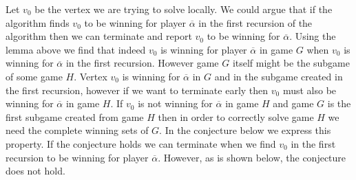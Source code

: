 Let $v_0$ be the vertex we are trying to solve locally. We could argue that if the algorithm finds $v_0$ to be winning for player $\overline{\alpha}$ in the first recursion of the algorithm then we can terminate and report $v_0$ to be winning for $\overline{\alpha}$. Using the lemma above we find that indeed $v_0$ is winning for player $\overline{\alpha}$ in game $G$ when $v_0$ is winning for $\overline{\alpha}$ in the first recursion. However game $G$ itself might be the subgame of some game $H$. Vertex $v_0$ is winning for $\overline{\alpha}$ in $G$ and in the subgame created in the first recursion, however if we want to terminate early then $v_0$ must also be winning for $\overline{\alpha}$ in game $H$. If $v_0$ is not winning for $\overline{\alpha}$ in game $H$ and game $G$ is the first subgame created from game $H$ then in order to correctly solve game $H$ we need the complete winning sets of $G$. In the conjecture below we express this property. If the conjecture holds we can terminate when we find $v_0$ in the first recursion to be winning for player $\overline{\alpha}$. However, as is shown below, the conjecture does not hold.
